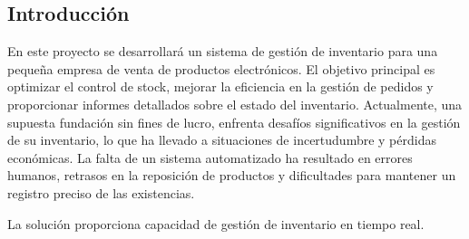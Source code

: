 %
%
%
%
%
%
%
%
%

\subsection{Introducción}\label{subsec:introduccion}
En este proyecto se desarrollará un sistema de gestión de inventario para una pequeña empresa de venta de productos electrónicos.
El objetivo principal es optimizar el control de stock, mejorar la eficiencia en la gestión de pedidos y proporcionar informes detallados sobre el estado del inventario.
Actualmente, una supuesta fundación sin fines de lucro, enfrenta desafíos significativos en la gestión de su inventario, lo que ha llevado a situaciones de incertudumbre y pérdidas económicas.
La falta de un sistema automatizado ha resultado en errores humanos, retrasos en la reposición de productos y dificultades para mantener un registro preciso de las existencias.

La solución proporciona capacidad de gestión de inventario en tiempo real.

